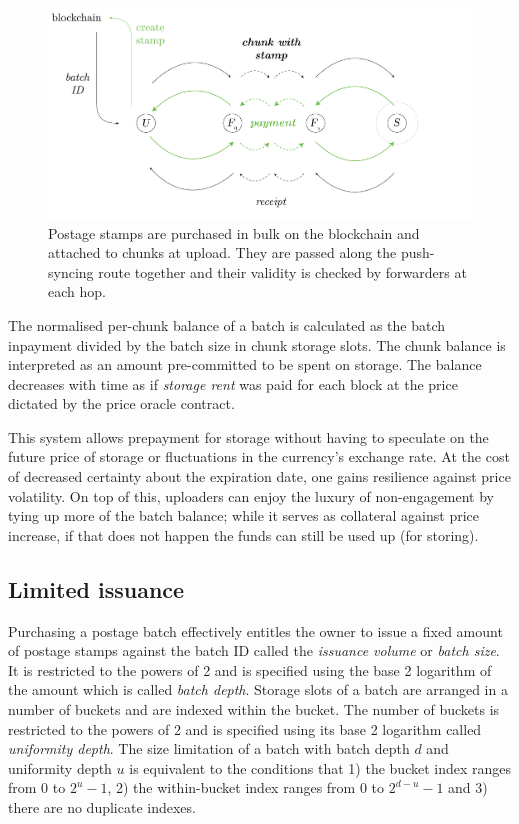 \begin{figure}[!th]
\centering
  \includegraphics[width=\textwidth]{fig/postage-stamp.pdf}
\caption[Postage stamps]{Postage stamps are purchased in bulk on the blockchain and attached to chunks at upload. They are passed along the push-syncing route together and their validity is checked by forwarders at each hop. }
\label{fig:postage-stamps}
\end{figure}

The normalised per-chunk balance of a batch is calculated as the batch inpayment divided by the batch size in chunk storage slots. The chunk balance is interpreted as an amount pre-committed to be spent on storage. The balance decreases with time as if \emph{storage rent} was paid for each block at the price dictated by the price oracle contract.  

This system allows prepayment for storage without having to speculate on the future price of storage or fluctuations in the currency's exchange rate. At the cost of decreased certainty about the expiration date, one gains resilience against price volatility. On top of this, uploaders can enjoy the luxury of non-engagement by tying up more of the batch balance; while it serves as collateral against price increase, if that does not happen the funds can still be used up (for storing).


\subsection{Limited issuance}\label{sec:limited-issuance}


Purchasing a postage batch effectively entitles the owner to issue a fixed amount of postage stamps against the batch ID called the \emph{issuance volume} or \emph{batch size}. It is restricted to the powers of 2 and is specified using the base 2 logarithm of the amount which is called \emph{batch depth}. Storage slots of a batch are arranged in a number of buckets and are indexed within the bucket. The number of buckets is restricted to the powers of 2 and is specified using its base 2 logarithm called \emph{uniformity depth}. The size limitation of a batch with batch depth $d$ and uniformity depth $u$ is equivalent to the conditions that 1) the bucket index ranges from 0 to $2^u-1$, 2) the within-bucket index ranges  from 0 to $2^{d-u}-1$ and 3) there are no duplicate indexes.  

